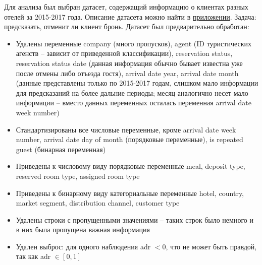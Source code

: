 Для анализа был выбран датасет, содержащий информацию о клиентах разных отелей за 2015-2017 года. Описание датасета можно найти в \hyperref[sec:app1]{приложении}. Задача: предсказать, отменит ли клиент бронь. Датасет был предварительно обработан:
\begin{itemize}
	\item Удалены переменные company (много пропусков), agent (ID туристических агенств -- зависит от приведенной классификации), reservation status, reservation status date (данная информация обычно бывает известна уже после отмены либо отъезда гостя), arrival date year, arrival date month (данные представлены только по 2015-2017 годам, слишком мало информации для предсказаний на более дальние периоды; месяц аналогично несет мало информации -- вместо данных переменных осталась переменная arrival date week number)
	\item Стандартизированы все числовые переменные, кроме arrival date week number, arrival date day of month (порядковые переменные), is repeated guest (бинарная переменная)
	\item Приведены к числовому виду порядковые переменные meal, deposit type, reserved room type, assigned room type
	\item Приведены к бинарному виду категориальные переменные hotel, country, market segment, distribution channel, customer type
	\item Удалены строки с пропущенными значениями -- таких строк было немного и в них была пропущена важная информация
	\item Удален выброс: для одного наблюдения adr $<0$, что не может быть правдой, так как adr $\in [0,1]$
\end{itemize}